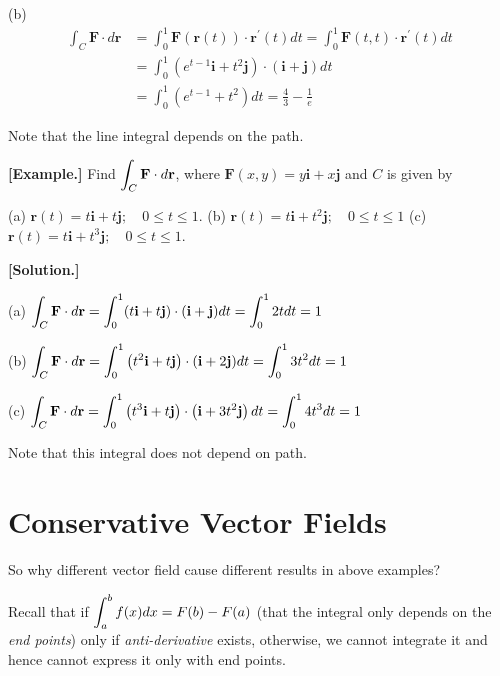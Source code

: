 \documentclass[11pt, a4paper]{MATH2023}
\newcommand{\eg}{\textbf{[Example.] }}
\newcommand{\sol}{\textbf{[Solution.] }}
\begin{document}
\begin{spacing}{1.3}
    (b)
    $$\begin{aligned}
    \int_{C} \mathbf{F} \cdot d \mathbf{r} &=\int_{0}^{1} \mathbf{F}(\mathbf{r}(t)) \cdot \mathbf{r}^{\prime}(t) d t=\int_{0}^{1} \mathbf{F}(t, t) \cdot \mathbf{r}^{\prime}(t) d t \\
    &=\int_{0}^{1}\left(e^{t-1} \mathbf{i}+t^{2} \mathbf{j}\right) \cdot(\mathbf{i}+\mathbf{j}) d t \\
    &=\int_{0}^{1}\left(e^{t-1}+t^{2}\right) d t =\frac{4}{3}-\frac{1}{e}
    \end{aligned}$$

    {\blue Note that the line integral depends on the path.}
    
    \vspace{0.2in}
    \eg Find $\displaystyle \int_{C} \mathbf{F} \cdot d \mathbf{r}$, where $\mathbf{F}(x, y)=y \mathbf{i}+x \mathbf{j}$ and $C$ is given by
    
    (a) $\mathbf{r}(t)=t \mathbf{i}+t \mathbf{j} ; \quad 0 \leqslant t \leqslant 1$.\hspace{0.2in}
    (b) $\mathbf{r}(t)=t \mathbf{i}+t^{2} \mathbf{j} ; \quad 0 \leqslant t \leqslant 1$\hspace{0.2in}
    (c) $\mathbf{r}(t)=t \mathbf{i}+t^{3} \mathbf{j} ; \quad 0 \leqslant t \leqslant 1$.

    \sol

    (a) $\displaystyle \int_{C} \mathbf{F} \cdot d \mathbf{r}=\int_{0}^{1}(t \mathbf{i}+t \mathbf{j}) \cdot(\mathbf{i}+\mathbf{j}) d t=\int_{0}^{1} 2 t d t=1$
    
    (b) $\displaystyle \int_{C} \mathbf{F} \cdot d \mathbf{r}=\int_{0}^{1}\left(t^{2} \mathbf{i}+t \mathbf{j}\right) \cdot(\mathbf{i}+2 \mathbf{j}) d t=\int_{0}^{1} 3 t^{2} d t=1$
    
    (c) $\displaystyle \int_{C} \mathbf{F} \cdot d \mathbf{r}=\int_{0}^{1}\left(t^{3} \mathbf{i}+t \mathbf{j}\right) \cdot\left(\mathbf{i}+3 t^{2} \mathbf{j}\right) d t=\int_{0}^{1} 4 t^{3} d t=1$

    {\blue Note that this integral does not depend on path.}

    \newpage
    \section{Conservative Vector Fields}

    {\blue So why different vector field cause different results in above examples?}
    
    Recall that if $\displaystyle \int_a^b f(x) dx=F(b)-F(a)$ (that the integral only depends on the 
    {\it end points}) only if {\it anti-derivative } exists, otherwise, we cannot integrate it
    and hence cannot express it only with end points.


\end{spacing}
\end{document}
